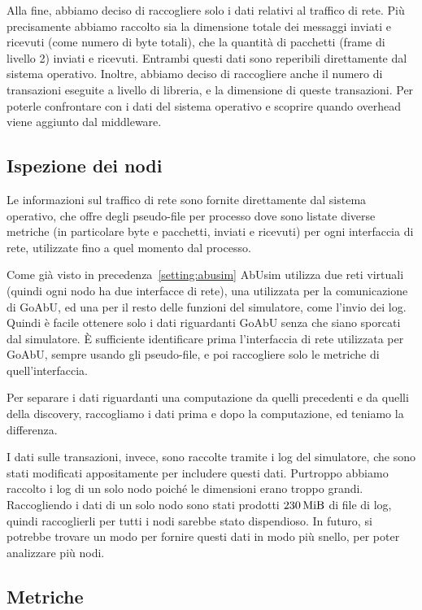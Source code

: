 \documentclass[12pt, a4paper]{article}
\begin{document}
Alla fine, abbiamo deciso di raccogliere solo i dati relativi al traffico di rete. Più precisamente abbiamo raccolto sia la dimensione totale dei messaggi inviati e ricevuti (come numero di byte totali), che la quantità di pacchetti (frame di livello 2) inviati e ricevuti. Entrambi questi dati sono reperibili direttamente dal sistema operativo.
Inoltre, abbiamo deciso di raccogliere anche il numero di transazioni eseguite a livello di libreria, e la dimensione di queste transazioni. Per poterle confrontare con i dati del sistema operativo e scoprire quando overhead viene aggiunto dal middleware.

\subsection{Ispezione dei nodi}

Le informazioni sul traffico di rete sono fornite direttamente dal sistema operativo, che offre degli pseudo-file per processo dove sono listate diverse metriche (in particolare byte e pacchetti, inviati e ricevuti) per ogni interfaccia di rete, utilizzate fino a quel momento dal processo.

Come già visto in precedenza~\ref{setting:abusim} AbUsim utilizza due reti virtuali (quindi ogni nodo ha due interfacce di rete), una utilizzata per la comunicazione di GoAbU, ed una per il resto delle funzioni del simulatore, come l'invio dei log.
Quindi è facile ottenere solo i dati riguardanti GoAbU senza che siano sporcati dal simulatore. È sufficiente identificare prima l'interfaccia di rete utilizzata per GoAbU, sempre usando gli pseudo-file, e poi raccogliere solo le metriche di quell'interfaccia.

Per separare i dati riguardanti una computazione da quelli precedenti e da quelli della discovery, raccogliamo i dati prima e dopo la computazione, ed teniamo la differenza.

I dati sulle transazioni, invece, sono raccolte tramite i log del simulatore, che sono stati modificati appositamente per includere questi dati.
Purtroppo abbiamo raccolto i log di un solo nodo poiché le dimensioni erano troppo grandi. Raccogliendo i dati di un solo nodo sono stati prodotti $\qty{230}{\mebi\byte}$ di file di log, quindi raccoglierli per tutti i nodi sarebbe stato dispendioso.
In futuro, si potrebbe trovare un modo per fornire questi dati in modo più snello, per poter analizzare più nodi.

\subsection{Metriche}
\end{document}

